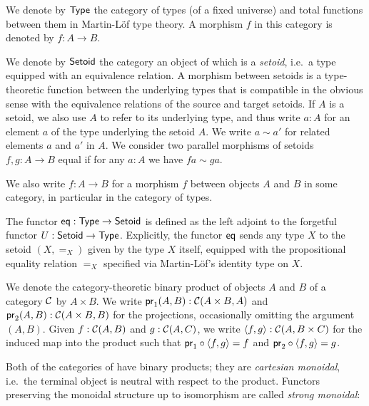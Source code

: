 \documentclass[envcountsame]{llncs}
\begin{document}
\begin{definition}\label{def:set_setoid}
 We denote by $\Set$ the category of types (of a fixed universe) and total functions between them in Martin-L\"of type theory. 
 A morphism $f$ in this category is denoted by $f : A \to B$.
 
 We denote by $\Setoid$ the category an object of which is a \emph{setoid}, i.e.\ a type equipped with an equivalence relation.
 A morphism between setoids is a type-theoretic function between the underlying types that is compatible in the obvious sense with the equivalence relations of the source and target setoids.
 If $A$ is a setoid, we also use $A$ to refer to its underlying type, and thus write $a:A$ for an element $a$ of the type underlying the setoid $A$. 
 We write $a\sim a'$ for related elements $a$ and $a'$ in $A$.
 We consider two parallel morphisms of setoids $f,g:A\to B$ equal if for any $a:A$ we have $fa \sim ga$.
 
 We also write $f:A\to B$ for a morphism $f$ between objects $A$ and $B$ in some category, in particular in the category of types.
 \end{definition}



\begin{definition}\label{def:eq}
 The functor $\eq : \Set\to\Setoid$ is defined as the left adjoint to the forgetful functor $U : \Setoid \to \Set$.
  Explicitly, the functor $\eq$ sends any type $X$ to the setoid $(X,=_X)$ given by the type $X$ itself, equipped
  with the propositional equality relation $=_X$ specified via Martin-L\"of's identity type on $X$.
\end{definition}


\begin{remark}
  We denote the category-theoretic binary product of objects $A$ and $B$ of a category $\C$ by $A\times B$.
  We write $\pr_1(A,B) : \C(A\times B, A)$ and $\pr_2(A,B) :\C(A\times B, B)$ for the projections, occasionally omitting the 
  argument $(A,B)$.
  Given $f : \C(A, B)$ and $g : \C(A,C)$, we write $\langle f,g\rangle : \C(A,B\times C)$ for the induced map into the product such that
  $\comp{\langle f,g\rangle}{\pr_1} = f$ and $\comp{\langle f,g\rangle}{\pr_2} = g$.
\end{remark}

Both of the categories of  have binary products; they are \emph{cartesian monoidal}, i.e.\ the terminal 
object is neutral with respect to the product. Functors preserving the monoidal structure up to isomorphism
are called \emph{strong monoidal}:
\end{document}
